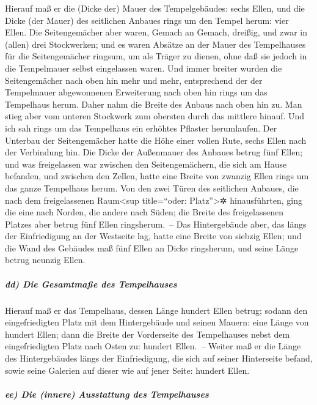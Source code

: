 Hierauf maß er die (Dicke der) Mauer des Tempelgebäudes:
sechs Ellen, und die Dicke (der Mauer) des seitlichen Anbaues rings um
den Tempel herum: vier Ellen. Die Seitengemächer aber
waren, Gemach an Gemach, dreißig, und zwar in (allen) drei Stockwerken;
und es waren Absätze an der Mauer des Tempelhauses für die
Seitengemächer ringsum, um als Träger zu dienen, ohne daß sie jedoch in
die Tempelmauer selbst eingelassen waren. Und immer
breiter wurden die Seitengemächer nach oben hin mehr und mehr,
entsprechend der der Tempelmauer abgewonnenen Erweiterung nach oben hin
rings um das Tempelhaus herum. Daher nahm die Breite des Anbaus nach
oben hin zu. Man stieg aber vom unteren Stockwerk zum obersten durch das
mittlere hinauf. Und ich sah rings um das Tempelhaus ein
erhöhtes Pflaster herumlaufen. Der Unterbau der Seitengemächer hatte die
Höhe einer vollen Rute, sechs Ellen nach der Verbindung hin.
Die Dicke der Außenmauer des Anbaues betrug fünf Ellen;
und was freigelassen war zwischen den Seitengemächern, die sich am Hause
befanden, und zwischen den Zellen, hatte eine Breite von
zwanzig Ellen rings um das ganze Tempelhaus herum. Von
den zwei Türen des seitlichen Anbaues, die nach dem freigelassenen
Raum\textless sup title=``oder: Platz''\textgreater✲ hinausführten, ging
die eine nach Norden, die andere nach Süden; die Breite des
freigelassenen Platzes aber betrug fünf Ellen ringsherum.~--
Das Hintergebäude aber, das längs der Einfriedigung an
der Westseite lag, hatte eine Breite von siebzig Ellen; und die Wand des
Gebäudes maß fünf Ellen an Dicke ringsherum, und seine Länge betrug
neunzig Ellen.

\hypertarget{dd-die-gesamtmauxdfe-des-tempelhauses}{%
\subparagraph{dd) Die Gesamtmaße des
Tempelhauses}\label{dd-die-gesamtmauxdfe-des-tempelhauses}}

Hierauf maß er das Tempelhaus, dessen Länge hundert Ellen
betrug; sodann den eingefriedigten Platz mit dem Hintergebäude und
seinen Mauern: eine Länge von hundert Ellen; dann die
Breite der Vorderseite des Tempelhauses nebst dem eingefriedigten Platz
nach Osten zu: hundert Ellen.~-- Weiter maß er die Länge
des Hintergebäudes längs der Einfriedigung, die sich auf seiner
Hinterseite befand, sowie seine Galerien auf dieser wie auf jener Seite:
hundert Ellen.

\hypertarget{ee-die-innere-ausstattung-des-tempelhauses}{%
\subparagraph{ee) Die (innere) Ausstattung des
Tempelhauses}\label{ee-die-innere-ausstattung-des-tempelhauses}}


